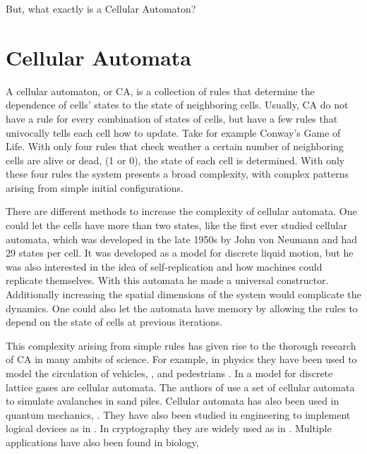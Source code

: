 But, what exactly is a Cellular Automaton?

\section{Cellular Automata}


A cellular automaton, or CA, is a collection of rules that determine the dependence of cells' states to the state of neighboring cells.
Usually, CA do not have a rule for every combination of states of cells, but have a few rules that univocally tells each cell how to update. Take for example Conway's Game of Life. With only four rules that check weather a certain number of neighboring cells are alive or dead, (1 or 0), the state of each cell is determined. With only these four rules the system presents a broad complexity, with complex patterns arising from simple initial configurations. 


There are different methods to increase the complexity of cellular automata. One could let the cells have more than two states, like the first ever studied cellular automata, which was developed in the late 1950s by John von Neumann \cite{VonNeummanCA} and had 29 states per cell. It was developed as a model for discrete liquid motion, but he was also interested in the idea of self-replication and how machines could replicate themselves. With this automata he made a universal constructor. Additionally increasing the spatial dimensions of the system would complicate the dynamics. One could also let the automata have memory by allowing the rules to depend on the state of cells at previous iterations.

This complexity arising from simple rules has given rise to the thorough research of CA in many ambits of science. For example, in physics they have been used to model the circulation of vehicles, \cite{PhysicsCA1}, and pedestrians \cite{PhysicsCA2}. In \cite{PhysicsCA3} a model for discrete lattice gases are cellular automata. The authors of \cite{PhysicsCA4} use a set of cellular automata to simulate avalanches in sand piles. Cellular automata has also been used in quantum mechanics, \cite{PhysicsCA5}. They have also been studied in engineering to implement logical devices as in \cite{EngineeringCA1}. In cryptography they are widely used as in \cite{CryptographyCA1, CryptographyCA2Lya}. Multiple applications have also been found in biology, \cite{BiologyCA1, BiologyCA2, BiologyCA3}


